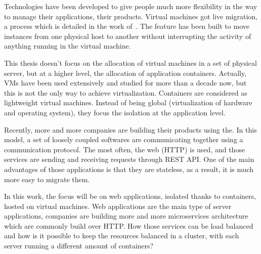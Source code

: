 Technologies have been developed to give people much more flexibility in the
way to manage their applications, their products. Virtual machines got live
migration, a process which is detailed in the work of~\citet*{livemigration}.
The feature has been built to move instances from one physical host to another
without interrupting the activity of anything running in the virtual machine.

This thesis doesn't focus on the allocation of virtual machines in a set of
physical server, but at a higher level, the allocation of application
containers. Actually, VMs have been used extensively and studied for more than
a decade now, but this is not the only way to achieve virtualization.
Containers are considered as lightweight virtual machines. Instead of
being global (virtualization of hardware and operating system), they
focus the isolation at the application level.

Recently, more and more companies are building their products using the. In
this model, a set of loosely coupled softwares are communicating together using
a communication protocol. The most often, the web (HTTP) is used, and those
services are sending and receiving requests through REST API\@. One of the main
advantages of those applications is that they are stateless, as a result, it is
much more easy to migrate them.

In this work, the focus will be on web applications, isolated thanks to
containers, hosted on virtual machines. Web applications are the main type of
server applications, companies are building more and more microservices
architecture~\cite{microservices} which are commonly build over HTTP\@. How those
services can be load balanced and how is it possible to keep the resources
balanced in a cluster, with each server running a different amount of
containers?

